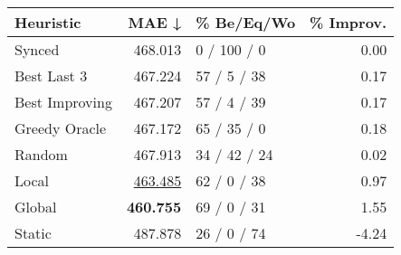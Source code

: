 \begin{tabular}{lrlr}
\toprule
\textbf{Heuristic} & \textbf{MAE ↓} & \textbf{\% Be/Eq/Wo} & \textbf{\% Improv.} \\
\midrule
            Synced &        468.013 &          0 / 100 / 0 &                0.00 \\
\midrule
       Best Last 3 &        467.224 &          57 / 5 / 38 &                0.17 \\
    Best Improving &        467.207 &          57 / 4 / 39 &                0.17 \\
\addlinespace
     Greedy Oracle &        467.172 &          65 / 35 / 0 &                0.18 \\
            Random &        467.913 &         34 / 42 / 24 &                0.02 \\
\midrule
             Local &        \underline{463.485} &          62 / 0 / 38 &                0.97 \\
            Global &        \textbf{460.755} &          69 / 0 / 31 &                1.55 \\
\midrule
            Static &        487.878 &          26 / 0 / 74 &               -4.24 \\
\bottomrule
\end{tabular}

\label{tab:iid_lr01_le1_bs4_Summary}

